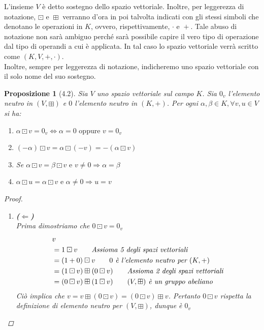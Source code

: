 \documentclass[11pt,a4paper]{article}
\theoremstyle{manuale}
\newtheorem*{proposizione}{Proposizione}
\theoremstyle{manualecorsivo}
\newcommand{\motivo}[1]{\tag*{\textit{#1}}}
\begin{document}
	L'insieme $V$ è detto sostegno dello spazio vettoriale. Inoltre, per leggerezza di notazione, $\boxdot \text{ e } \boxplus$ verranno d'ora in poi talvolta indicati con gli stessi simboli che denotano le operazioni in $K$, ovvero, rispettivamente, $\cdot \text{ e } +$. Tale abuso di notazione non sarà ambiguo perché sarà possibile capire il vero tipo di operazione dal tipo di operandi a cui è applicata. In tal caso lo spazio vettoriale verrà scritto come $(K,V,+,\cdot)$. \\
	Inoltre, sempre per leggerezza di notazione, indicheremo uno spazio vettoriale con il solo nome del suo sostegno.
	
	\begin{proposizione}[4.2]
		Sia $V$ uno spazio vettoriale sul campo $K$. Sia $0_{v}$ l'elemento neutro in $(V, \boxplus)$ e $0$ l'elemento neutro in $(K, +)$. Per ogni $\alpha, \beta \in K, \forall v,u \in V$ si ha:
		\begin{enumerate}[label=\roman*)]
			\item $\alpha \boxdot v = 0_{v} \iff \alpha = 0 \text{ oppure } v = 0_{v}$
			\item $(-\alpha) \boxdot v = \alpha \boxdot (-v) = -(\alpha \boxdot v)$
			\item Se $\alpha \boxdot v = \beta \boxdot v \text{ e } v \neq 0 \Rightarrow \alpha = \beta$
			\item $\alpha \boxdot u = \alpha \boxdot v \text{ e } \alpha \neq 0 \Rightarrow u = v$
		\end{enumerate}
		\begin{proof}
			\leavevmode\vspace{-0.5\baselineskip}
			\begin{enumerate}[label=\roman*)]
				\item \textbf{($\Leftarrow$)} \\
				Prima dimostriamo che $0 \boxdot v = 0_v$ \\
				\begin{align*}
					&v \\
					& = 1 \boxdot v \motivo{Assioma 5 degli spazi vettoriali} \\
					& = (1+0) \boxdot v \motivo{$0$ è l'elemento neutro per $(K,+)$} \\
					& = (1 \boxdot v) \boxplus (0 \boxdot v) \motivo{Assioma 2 degli spazi vettoriali} \\
					& = (0 \boxdot v) \boxplus (1 \boxdot v) \motivo{$(V,\boxplus)$ è un gruppo abeliano}
				\end{align*}
				Ciò implica che $v = v \boxplus (0 \boxdot v) = (0 \boxdot v) \boxplus v $. Pertanto $0 \boxdot v $  rispetta la definizione di elemento neutro per $(V, \boxplus)$, dunque è $0_v$\\

\end{enumerate}
\end{proof}
\end{proposizione}
\end{document}
